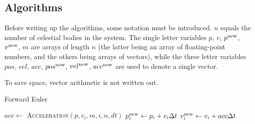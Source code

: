 \documentclass[a4paper]{article}
\begin{document}


\subsection{Algorithms}

Before writing up the algorithms, some notation must be introduced.
$n$ equals the number of celestial bodies in the system.
The single letter variables $p$, $v$, $p^{\mathrm{new}}$, $v^{\mathrm{new}}$, $m$ are arrays of length $n$ (the latter being an array of floating-point numbers, and the others being arrays of vectors), while the three letter variables $pos$, $vel$, $acc$, $pos^{\mathrm{new}}$, $vel^{\mathrm{new}}$, $acc^{\mathrm{new}}$ are used to denote a single vector.

To save space, vector arithmetic is not written out.

\begin{algorithm}
\caption{Forward Euler} \label{alg:forward_euler}
\begin{algorithmic}[1]
        \State $acc \gets $ \textsc{Acceleration}$(p, v_{i}, m, i, n, dt)$
        \State $p^{\mathrm{new}}_{i} \gets p_{i} + v_{i} {\Delta t}$
        \State $v^{\mathrm{new}}_{i} \gets v_{i} + acc {\Delta t}$
    \EndFor
  \EndProcedure
\end{algorithmic}
\end{algorithm}
\end{document}
